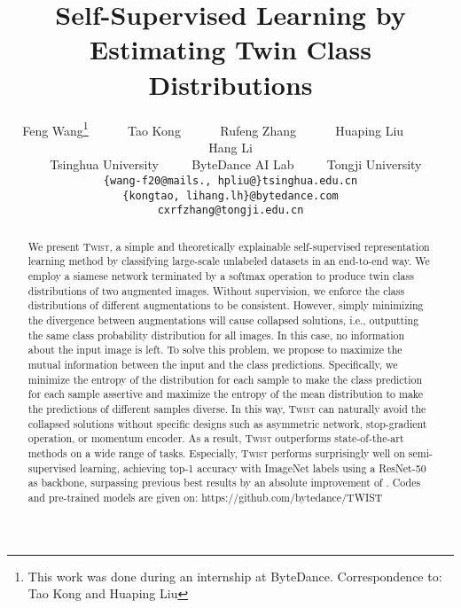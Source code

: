 \documentclass[10pt,twocolumn,letterpaper]{article}
\begin{document}
\title{Self-Supervised Learning by Estimating Twin Class Distributions}
\author{
Feng Wang\thanks{This work was done during an internship at ByteDance. Correspondence to: Tao Kong and Huaping Liu}
        ~~~~~
        Tao Kong 
        ~~~~~
        Rufeng Zhang
        ~~~~~
        Huaping Liu
        ~~~~~
        Hang Li 
        \\~
        Tsinghua University
        ~~~~
        ByteDance AI Lab  
        ~~~~
        Tongji University 
        \\
        \texttt{\{wang-f20@mails., hpliu@\}tsinghua.edu.cn}\\
        \texttt{\{kongtao, lihang.lh\}@bytedance.com}\\
        \texttt{cxrfzhang@tongji.edu.cn}
}

\maketitle
\def\ourmethod{\textsc{Twist}\xspace}
\begin{abstract}
We present \ourmethod, a simple and theoretically explainable self-supervised representation learning method by classifying large-scale unlabeled datasets in an end-to-end way. We employ a siamese network terminated by a softmax operation to produce twin class distributions of two augmented images. Without supervision, we enforce the class distributions of different augmentations to be consistent. However, simply minimizing the divergence between augmentations will cause collapsed solutions, i.e., outputting the same class probability distribution for all images. In this case, no information about the input image 
is left. To solve this problem, we propose to maximize the mutual information between the input and the class predictions. Specifically, we minimize the entropy of the distribution for each sample to make the class prediction for each sample assertive and maximize the entropy of the mean distribution to make the predictions of different samples diverse. In this way, \ourmethod can naturally avoid the collapsed solutions without specific designs such as asymmetric network, stop-gradient operation, or momentum encoder. 
As a result, \ourmethod outperforms state-of-the-art methods on a wide range of tasks. Especially, \ourmethod performs surprisingly well on semi-supervised learning, achieving  
top-1 accuracy with  
ImageNet labels using a ResNet-50 as backbone, surpassing previous best results by an absolute improvement of . Codes and pre-trained models are given on: \textcolor{linkcolor}{https://github.com/bytedance/TWIST}

\end{abstract}
\end{document}
